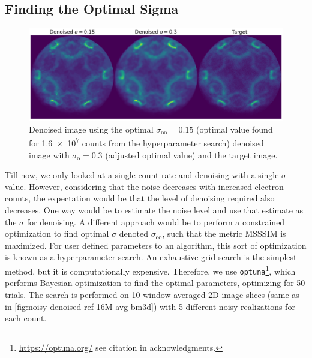 \subsection{Finding the Optimal Sigma}
\begin{figure}
    \centering
    \includegraphics[width=1\linewidth]{images/denoised_optimal_sigma.pdf}
    \caption{Denoised image using the optimal $\sigma_{\text{oo}}=0.15$ (optimal value found for \num{1.6e7} counts from the hyperparameter search) denoised image with $\sigma_{\text{o}}=0.3$ (adjusted optimal value) and the target image.}
    \label{fig:denoised-optimal-sigma}
\end{figure}
Till now, we only looked at a single count rate and denoising with a single $\sigma$ value. However, considering that the noise decreases with increased electron counts, the expectation would be that the level of denoising required also decreases. One way would be to estimate the noise level and use that estimate as the $\sigma$ for denoising. A different approach would be to perform a constrained optimization to find optimal $\sigma$ denoted $\sigma_{\text{oo}}$, such that the metric \gls{MSSSIM} is maximized. For user defined parameters to an algorithm, this sort of optimization is known as a hyperparameter search. An exhaustive grid search is the simplest method, but it is computationally expensive. Therefore, we use \texttt{optuna}\footnote{\href{https://optuna.org/}{https://optuna.org/} see citation in acknowledgments.}, which performs Bayesian optimization to find the optimal parameters, optimizing for \num{50} trials. The search is performed on \num{10} window-averaged 2D image slices (same as in \cref{fig:noisy-denoised-ref-16M-avg-bm3d}) with 5 different noisy realizations for each count.

